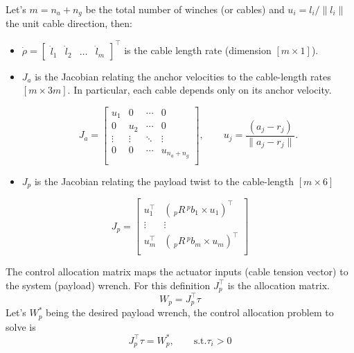 Let's $m = n_a + n_g$ be the total number of winches (or cables) and $u_i = l_i/\|l_i\|$ the unit cable direction, then:
\begin{itemize}
    \item $\dot{\rho} = \begin{bmatrix}
        \dot{l}_1 & \dot{l}_2 & \dots & \dot{l}_m
    \end{bmatrix}^\top$ is the cable length rate (dimension $[m\times1]$). 

    \item $J_a$ is the Jacobian relating the anchor velocities to the cable-length rates $[m\times3m]$. In particular, each cable depends only on its anchor velocity.
    
\begin{equation}
J_a =
\begin{bmatrix}
u_1 & 0   & \cdots & 0 \\
0   & u_2 & \cdots & 0 \\
\vdots & \vdots & \ddots & \vdots \\
0 & 0 & \cdots & u_{n_a + n_g} \\
\end{bmatrix},
\qquad
u_j = \frac{(a_j - r_j)}{\|a_j - r_j\|}.
\label{eq:cableVector}
\end{equation}
    \item $J_p$ is the Jacobian relating the payload twist to the cable-length  $[m\times6]$
\end{itemize}
\begin{equation}
    J_p =
\begin{bmatrix}
u_1^\top & \left( \, _pR\, ^pb_1 \times u_1 \right)^\top \\ 
\vdots & \vdots \\
u_m^\top & \left( \, _pR\, ^pb_m \times u_m \right)^\top \\
\end{bmatrix}
\label{eq:jp}
\end{equation}

\noindent The control allocation matrix maps the actuator inputs (cable tension vector) to the system (payload) wrench. For this definition $J_p^\top$ is the allocation matrix.
\begin{equation}
    W_p = J_p^\top \tau
\end{equation}
Let's $W_p^*$ being the desired payload wrench, the control allocation problem to solve is
\begin{equation}
    J_p^\top \tau = W_p^*, \qquad \text{s.t}. \tau_i > 0
\end{equation}

